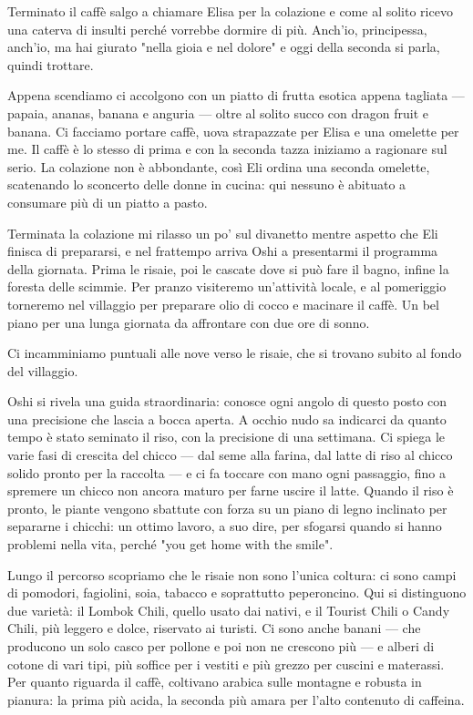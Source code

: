 Terminato il caffè salgo a chiamare Elisa per la colazione e come al solito ricevo una caterva di insulti perché vorrebbe dormire di più. Anch'io, principessa, anch'io, ma hai giurato "nella gioia e nel dolore" e oggi della seconda si parla, quindi trottare.

Appena scendiamo ci accolgono con un piatto di frutta esotica appena tagliata — papaia, ananas, banana e anguria — oltre al solito succo con dragon fruit e banana. Ci facciamo portare caffè, uova strapazzate per Elisa e una omelette per me. Il caffè è lo stesso di prima e con la seconda tazza iniziamo a ragionare sul serio. La colazione non è abbondante, così Eli ordina una seconda omelette, scatenando lo sconcerto delle donne in cucina: qui nessuno è abituato a consumare più di un piatto a pasto.

Terminata la colazione mi rilasso un po' sul divanetto mentre aspetto che Eli finisca di prepararsi, e nel frattempo arriva Oshi a presentarmi il programma della giornata. Prima le risaie, poi le cascate dove si può fare il bagno, infine la foresta delle scimmie. Per pranzo visiteremo un'attività locale, e al pomeriggio torneremo nel villaggio per preparare olio di cocco e macinare il caffè. Un bel piano per una lunga giornata da affrontare con due ore di sonno.

Ci incamminiamo puntuali alle nove verso le risaie, che si trovano subito al fondo del villaggio.

Oshi si rivela una guida straordinaria: conosce ogni angolo di questo posto con una precisione che lascia a bocca aperta. A occhio nudo sa indicarci da quanto tempo è stato seminato il riso, con la precisione di una settimana. Ci spiega le varie fasi di crescita del chicco — dal seme alla farina, dal latte di riso al chicco solido pronto per la raccolta — e ci fa toccare con mano ogni passaggio, fino a spremere un chicco non ancora maturo per farne uscire il latte. Quando il riso è pronto, le piante vengono sbattute con forza su un piano di legno inclinato per separarne i chicchi: un ottimo lavoro, a suo dire, per sfogarsi quando si hanno problemi nella vita, perché "you get home with the smile".

Lungo il percorso scopriamo che le risaie non sono l'unica coltura: ci sono campi di pomodori, fagiolini, soia, tabacco e soprattutto peperoncino. Qui si distinguono due varietà: il Lombok Chili, quello usato dai nativi, e il Tourist Chili o Candy Chili, più leggero e dolce, riservato ai turisti. Ci sono anche banani — che producono un solo casco per pollone e poi non ne crescono più — e alberi di cotone di vari tipi, più soffice per i vestiti e più grezzo per cuscini e materassi. Per quanto riguarda il caffè, coltivano arabica sulle montagne e robusta in pianura: la prima più acida, la seconda più amara per l'alto contenuto di caffeina.

